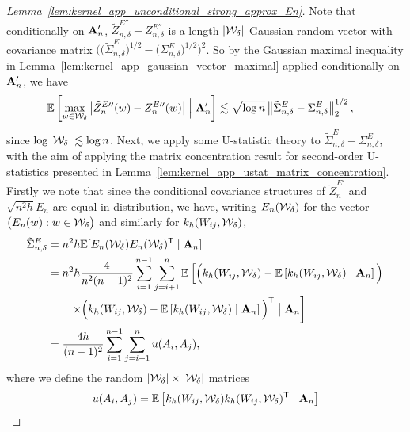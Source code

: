 \begin{proof}[Lemma~\ref{lem:kernel_app_unconditional_strong_approx_En}]
  Note that conditionally on $\mathbf{A}_n'$,
  $\tilde Z_{n,\delta}^{E\dprime} - Z_{n,\delta}^{E\dprime}$
  is a length-$|\mathcal{W}_\delta|$
  Gaussian random vector with covariance matrix
  $\big(
    \big(\tilde \Sigma^E_{n,\delta}\big)^{1/2}
    - \big(\Sigma^E_{n,\delta}\big)^{1/2}
  \big)^2$.
  So by the Gaussian maximal inequality in
  Lemma~\ref{lem:kernel_app_gaussian_vector_maximal}
  applied conditionally on $\mathbf{A}_n'$,
  we have
  \begin{align*}
    \mathbb{E}\left[
      \max_{w \in \mathcal{W}_\delta}
      \big|\tilde Z_n^{E\prime\prime}(w) - Z_n^{E\prime\prime}(w)\big|
      \Bigm| \mathbf{A}_n'
    \right]
    &\lesssim
    \sqrt{\log n}
    \left\|
    \tilde\Sigma^E_{n,\delta}
    - \Sigma^E_{n,\delta}
    \right\|_2^{1/2},
  \end{align*}
  since $\log |\mathcal{W}_\delta| \lesssim \log n$.
  Next, we apply some U-statistic theory to
  $\tilde\Sigma^E_{n,\delta} - \Sigma^E_{n,\delta}$,
  with the aim of applying the
  matrix concentration result
  for second-order U-statistics
  presented in Lemma~\ref{lem:kernel_app_ustat_matrix_concentration}.
  Firstly we note that
  since
  the conditional covariance structures of
  $\tilde Z_n^{E\prime}$ and $\sqrt{n^2h} E_n$
  are equal in distribution,
  we have,
  writing $E_n(\mathcal{W}_\delta)$
  for the vector $\big(E_n(w) : w \in \mathcal{W}_\delta\big)$
  and similarly for $k_h(W_{i j}, \mathcal{W}_\delta)$,
  \begin{align*}
    \tilde\Sigma^E_{n,\delta}
    &=
    n^2h \mathbb{E}[E_n(\mathcal{W}_\delta) E_n(\mathcal{W}_\delta)^{\mathsf{T}} \mid \mathbf{A}_n] \\
    &=
    n^2h
    \frac{4}{n^2(n-1)^2}
    \sum_{i=1}^{n-1}
    \sum_{j=i+1}^{n}
    \mathbb{E}\left[
      \Big(
        k_h(W_{i j}, \mathcal{W}_\delta)
        - \mathbb{E}\left[
          k_h(W_{i j}, \mathcal{W}_\delta)
          \mid \mathbf{A}_n
        \right]
      \Big)
      \right. \\
      &\qquad\left.
      \times\Big(
        k_h(W_{i j}, \mathcal{W}_\delta)
        - \mathbb{E}\left[
          k_h(W_{i j}, \mathcal{W}_\delta)
          \mid \mathbf{A}_n
        \right]
      \Big)^{\mathsf{T}}
      \bigm\vert \mathbf{A}_n
    \right] \\
    &=
    \frac{4h}{(n-1)^2}
    \sum_{i=1}^{n-1}
    \sum_{j=i+1}^{n}
    u(A_i, A_j),
  \end{align*}
  where we
  define the random
  $|\mathcal{W}_\delta| \times |\mathcal{W}_\delta|$
  matrices
  \begin{align*}
    u(A_i, A_j)
    &=
    \E\left[
      k_h(W_{i j}, \cW_\delta)
      k_h(W_{i j}, \cW_\delta)^\T
      \mid \bA_n
    \right] \\

\end{align*}
\end{proof}
